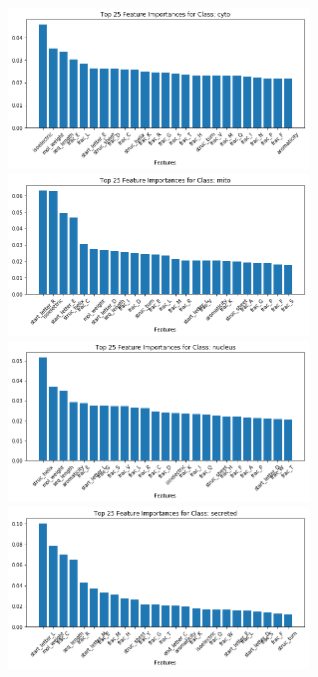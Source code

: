 \documentclass{bioinfo}
\begin{document}
\begin{figure}[!h]
\includegraphics[width=8cm]{cyto_import}
\centering
\includegraphics[width=8cm]{mito_import}
\centering
\includegraphics[width=8cm]{nucleus_import}
\centering
\includegraphics[width=8cm]{secreted_import}
\centering
\end{figure}
\end{document}
